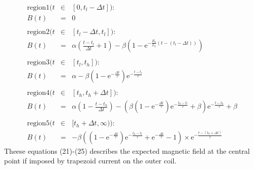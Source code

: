 \begin{eqnarray}
  \mathrm{region1}(t&\in&[0, t_l-\Delta t]):\nonumber\\
  B(t) &=& 0\\
  \nonumber\\
  \mathrm{region2}(t&\in&[t_l-\Delta t, t_l]):\nonumber\\
  B(t) &=& \alpha\left(\frac{t-t_l}{\Delta t} + 1\right) - \beta\left( 1 - \mathrm{e}^{-\frac{R_2}{L_2}(t-(t_l-\Delta t))}\right)\\
  \nonumber\\
  \mathrm{region3}(t&\in&[t_l, t_h]):\nonumber\\
  B(t) &=& \alpha - \beta\left( 1-\mathrm{e}^{-\frac{\Delta t}{\tau}} \right)\mathrm{e}^{-\frac{t-t_l}{\tau}}\\
  \nonumber\\
  \mathrm{region4}(t&\in&[t_h, t_h+\Delta t]):\nonumber\\
  B(t) &=& \alpha\left( 1-\frac{t-t_h}{\Delta t} \right) - \left( \beta\left(1-\mathrm{e}^{-\frac{\Delta t}{\tau}}\right)\mathrm{e}^{-\frac{t_h-t_l}{\tau}} + \beta \right)\mathrm{e}^{-\frac{t-t_h}{\tau}} + \beta\\
  \nonumber\\
  \mathrm{region5}(t&\in&[t_h+\Delta t, \infty)):\nonumber\\
  B(t) &=& -\beta\left( \left(1-\mathrm{e}^{-\frac{\Delta t}{\tau}}\right)\mathrm{e}^{-\frac{t_h-t_l}{\tau}} + \mathrm{e}^{-\frac{\Delta t}{\tau}} -1 \right) \times\mathrm{e}^{-\frac{t-(t_h+\Delta t)}{\tau}}
\end{eqnarray}
Theese equations (21)-(25) describes the expected magnetic field at the central point if imposed by trapezoid current on the outer coil.


